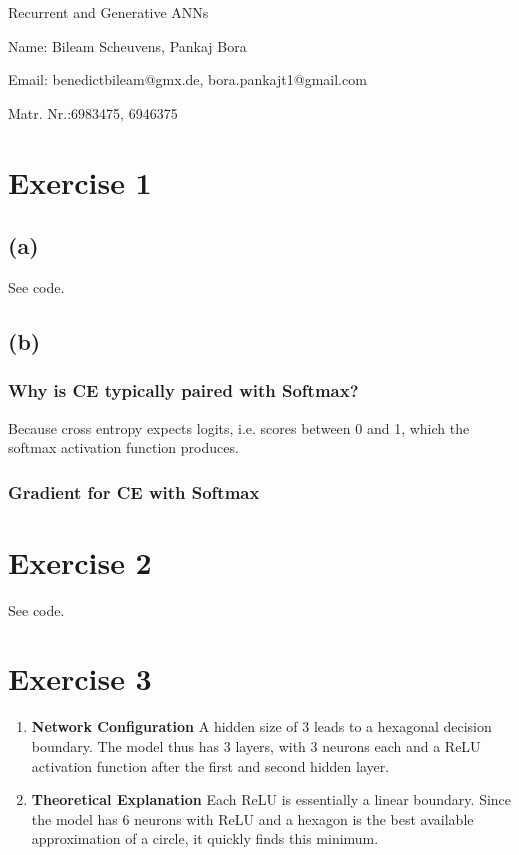 \documentclass[11pt]{article}
\numberwithin{equation}{section}
\begin{document}
\begin{center}
    \sc Recurrent and Generative ANNs
\end{center}

\noindent Name: Bileam Scheuvens, Pankaj Bora

\noindent Email: benedictbileam@gmx.de, bora.pankajt1@gmail.com

\noindent Matr. Nr.:6983475, 6946375



\section*{Exercise 1}
\subsection*{(a)}
See code.
\subsection*{(b)}
\subsubsection*{Why is CE typically paired with Softmax?}
Because cross entropy expects logits, i.e. scores between 0 and 1, which the softmax activation function produces.

\subsubsection{Gradient for CE with Softmax}

\section*{Exercise 2}
See code.

\section*{Exercise 3}

\begin{enumerate}
  \item{
\textbf{Network Configuration}
A hidden size of 3 leads to a hexagonal decision boundary.
The model thus has 3 layers, with 3 neurons each and a ReLU activation function after the first and second hidden layer.
}
\item{
\textbf{Theoretical Explanation}
Each ReLU is essentially a linear boundary.
Since the model has 6 neurons with ReLU and a hexagon is the best available approximation of a circle, it quickly finds this minimum.
  }
\end{enumerate}
\end{document}

